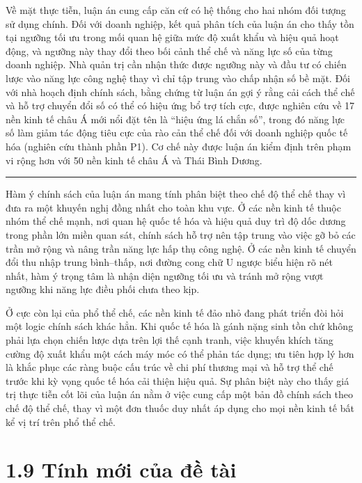 \documentclass[
  a4paper,
  13pt]{extreport}
\begin{document}
Về mặt thực tiễn, luận án cung cấp căn cứ có hệ thống cho hai nhóm đối
tượng sử dụng chính. Đối với doanh nghiệp, kết quả phân tích của luận án
cho thấy tồn tại ngưỡng tối ưu trong mối quan hệ giữa mức độ xuất khẩu
và hiệu quả hoạt động, và ngưỡng này thay đổi theo bối cảnh thể chế và
năng lực số của từng doanh nghiệp. Nhà quản trị cần nhận thức được
ngưỡng này và đầu tư có chiến lược vào năng lực công nghệ thay vì chỉ
tập trung vào chấp nhận số bề mặt. Đối với nhà hoạch định chính sách,
bằng chứng từ luận án gợi ý rằng cải cách thể chế và hỗ trợ chuyển đổi
số có thể có hiệu ứng bổ trợ tích cực, được nghiên cứu về 17 nền kinh tế
châu Á mới nổi đặt tên là ``hiệu ứng lá chắn số'', trong đó năng lực số
làm giảm tác động tiêu cực của rào cản thể chế đối với doanh nghiệp quốc
tế hóa (nghiên cứu thành phần P1). Cơ chế này được luận án kiểm định
trên phạm vi rộng hơn với 50 nền kinh tế châu Á và Thái Bình Dương.

\begin{center}\rule{0.5\linewidth}{0.5pt}\end{center}

Hàm ý chính sách của luận án mang tính phân biệt theo chế độ thể chế
thay vì đưa ra một khuyến nghị đồng nhất cho toàn khu vực. Ở các nền
kinh tế thuộc nhóm thể chế mạnh, nơi quan hệ quốc tế hóa và hiệu quả duy
trì độ dốc dương trong phần lớn miền quan sát, chính sách hỗ trợ nên tập
trung vào việc gỡ bỏ các trần mở rộng và nâng trần năng lực hấp thụ công
nghệ. Ở các nền kinh tế chuyển đổi thu nhập trung bình--thấp, nơi đường
cong chữ U ngược biểu hiện rõ nét nhất, hàm ý trọng tâm là nhận diện
ngưỡng tối ưu và tránh mở rộng vượt ngưỡng khi năng lực điều phối chưa
theo kịp.

Ở cực còn lại của phổ thể chế, các nền kinh tế đảo nhỏ đang phát triển
đòi hỏi một logic chính sách khác hẳn. Khi quốc tế hóa là gánh nặng sinh
tồn chứ không phải lựa chọn chiến lược dựa trên lợi thế cạnh tranh, việc
khuyến khích tăng cường độ xuất khẩu một cách máy móc có thể phản tác
dụng; ưu tiên hợp lý hơn là khắc phục các ràng buộc cấu trúc về chi phí
thương mại và hỗ trợ thể chế trước khi kỳ vọng quốc tế hóa cải thiện
hiệu quả. Sự phân biệt này cho thấy giá trị thực tiễn cốt lõi của luận
án nằm ở việc cung cấp một bản đồ chính sách theo chế độ thể chế, thay
vì một đơn thuốc duy nhất áp dụng cho mọi nền kinh tế bất kể vị trí trên
phổ thể chế.

\hypertarget{tuxednh-mux1edbi-cux1ee7a-ux111ux1ec1-tuxe0i}{%
\section{1.9 Tính mới của đề
tài}\label{tuxednh-mux1edbi-cux1ee7a-ux111ux1ec1-tuxe0i}}
\end{document}
